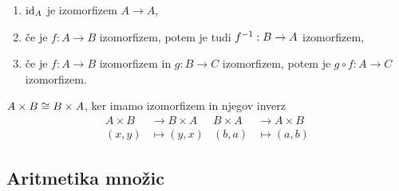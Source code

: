 \begin{dokaz}
  \begin{enumerate}
     \item $\id[A]$ je izomorfizem $A \to A$,
     \item če je $f : A \to B$ izomorfizem, potem je tudi $\inv{f} : B \to A$ izomorfizem,
     \item če je $f : A \to B$ izomorfizem in $g : B \to C$ izomorfizem, potem je $g \circ f : A \to C$ izomorfizem.
  \end{enumerate}
\end{dokaz}

\begin{primer}
  $A \times B \iso B \times A$, ker imamo izomorfizem in njegov inverz
  \begin{align*}
    A \times B  &\to  B \times A      &    B \times A  &\to  A \times B \\
    (x, y) &\mapsto  (y, x)           &    (b, a) &\mapsto  (a, b)
  \end{align*}
\end{primer}

\subsection{Aritmetika množic}

